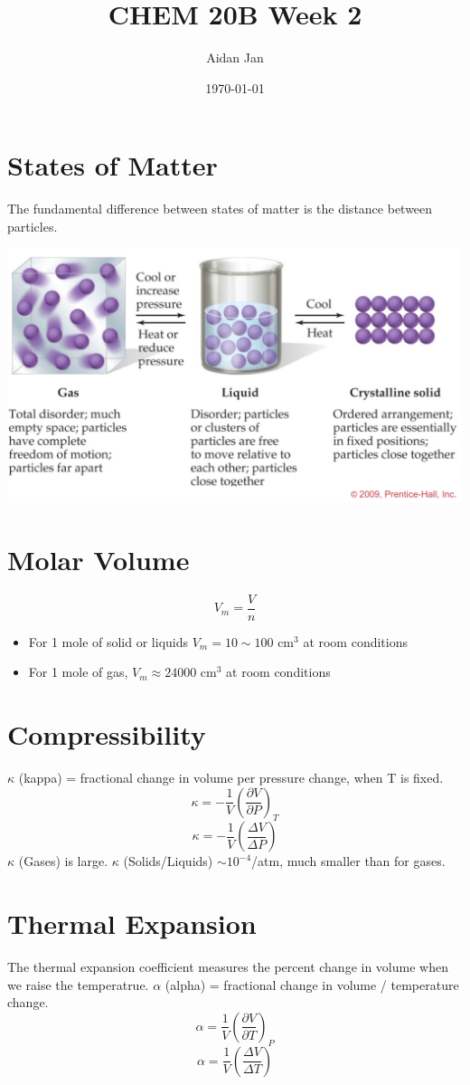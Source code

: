 \documentclass[10pt]{article}
\title{CHEM 20B Week 2}
\author{Aidan Jan}
\date{\today}
\begin{document}
\maketitle
\section*{States of Matter}
The fundamental difference between states of matter is the distance between particles.
\begin{center}
    \includegraphics*[scale=0.5]{W2_1.png}
\end{center}

\section*{Molar Volume}
\[V_m = \frac{V}{n}\]
\begin{itemize}
    \item For 1 mole of solid or liquids $V_m = 10 \sim 100$ cm$^3$ at room conditions
    \item For 1 mole of gas, $V_m \approx 24000$ cm$^3$ at room conditions
\end{itemize}

\section*{Compressibility}
$\kappa$ (kappa) = fractional change in volume per pressure change, when T is fixed.
\[\kappa = -\frac{1}{V} \left(\frac{\partial V}{\partial P}\right)_T\]
\[\kappa = -\frac{1}{V} \left(\frac{\Delta V}{\Delta P}\right)\]
$\kappa$ (Gases) is large.
$\kappa$ (Solids/Liquids) $\sim 10^{-4}$/atm, much smaller than for gases.

\section*{Thermal Expansion}
The thermal expansion coefficient measures the percent change in volume when we raise the temperatrue.  $\alpha$ (alpha) = fractional change in volume / temperature change.
\[\alpha = \frac{1}{V} \left(\frac{\partial V}{\partial T}\right)_P\]
\[\alpha = \frac{1}{V} \left(\frac{\Delta V}{\Delta T}\right)\]
\end{document}
